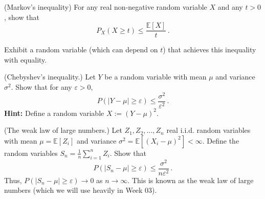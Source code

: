 \documentclass[a4paper,10pt,landscape,twocolumn]{scrartcl}
\begin{document}
\homeworkproblems

\begin{exercise}
	\begin{subex}[(2pt)] (Markov's inequality) For any real non-negative random variable $X$ and any $t > 0$, show that
	\[
	P_X(X \geq t) \leq \frac{\mathbb{E}[X]}{t}\, .
	\]
\end{subex}
\begin{subex}[(1pt)]
	Exhibit a random variable (which can depend on $t$) that achieves this inequality with equality.
	\end{subex}

	\begin{subex}[(3pt)] (Chebyshev's inequality.) Let $Y$ be a random variable with mean $\mu$ and variance $\sigma^2$. Show that for any $\varepsilon > 0$,
	\[
	P(|Y - \mu| \geq \varepsilon) \leq \frac{\sigma^2}{\varepsilon^2} \, .
	\]
	\textbf{Hint:} Define a random variable $X := (Y - \mu)^2$.
	\end{subex}
	\begin{subex}[(3pt)] (The weak law of large numbers.) Let $Z_1, Z_2, ..., Z_n$ real i.i.d. random variables with mean $\mu = \mathbb{E}[Z_i]$ and variance $\sigma^2 = \mathbb{E}[(X_i - \mu)^2] < \infty$. Define the random variables $S_n = \frac{1}{n} \sum_{i=1}^n Z_i$. Show that
	\[
	P(|S_n - \mu | \geq \varepsilon) \leq \frac{\sigma^2}{n\varepsilon^2}\, .
	\]
	Thus, $P(|S_n - \mu| \geq \varepsilon) \to 0$ as $n \to \infty$. This is known as the weak law of large numbers (which we will use heavily in Week 03).
	\end{subex}
\end{exercise}


\end{document}
